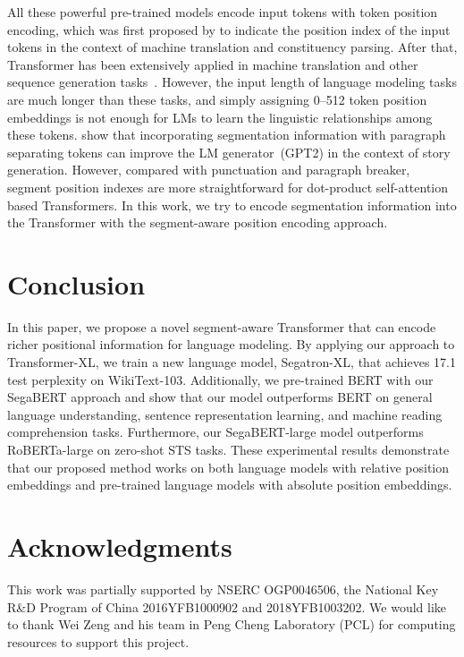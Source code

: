 \documentclass[letterpaper]{article}
\begin{document}
All these powerful pre-trained models encode input tokens with token position encoding, which was first proposed by \citet{DBLP:conf/nips/VaswaniSPUJGKP17} to indicate the position index of the input tokens in the context of machine translation and constituency parsing.
After that, Transformer has been extensively applied in machine translation and other sequence generation tasks~\cite{li-etal-2019-attribute, liu2019text,roller2020recipes}.
However, the input length of language modeling tasks are much longer than these tasks, and simply assigning 0--512 token position embeddings is not enough for LMs to learn the linguistic relationships among these tokens. 
\citet{DBLP:journals/corr/abs-2004-02251} show that incorporating segmentation information with paragraph separating tokens can improve the LM generator~(GPT2) in the context of story generation.
However, compared with punctuation and paragraph breaker, segment position indexes are more straightforward for dot-product self-attention based Transformers. 
In this work, we try to encode segmentation information into the Transformer with the segment-aware position encoding approach.

 \section{Conclusion}
In this paper, we propose a novel segment-aware Transformer that can encode richer positional information for language modeling. 
By applying our approach to Transformer-XL, we train a new language model, Segatron-XL, that achieves 17.1 test perplexity on WikiText-103.
Additionally, we pre-trained BERT with our SegaBERT approach and show that our model outperforms BERT on general language understanding, sentence representation learning, and machine reading comprehension tasks.
Furthermore, our SegaBERT-large model outperforms RoBERTa-large on zero-shot STS tasks.
These experimental results demonstrate that our proposed method works on both language models with relative position embeddings and pre-trained language models with absolute position embeddings. 


 \section*{Acknowledgments}
This work was partially supported by NSERC OGP0046506, the National Key R\&D Program of China 2016YFB1000902 and 2018YFB1003202.
We would like to thank Wei Zeng and his team in Peng Cheng Laboratory (PCL) for computing resources to support this project.
\end{document}
